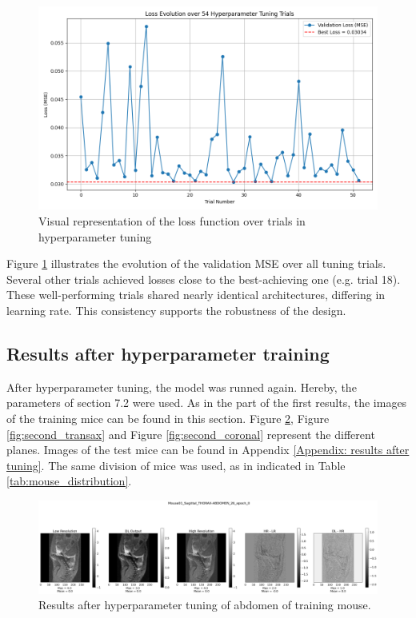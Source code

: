 \documentclass[twocolumn]{article}
\begin{document}
\begin{figure}[h]
    \centering
    \includegraphics[width=1\linewidth]{loss_hyperparameters.png}
    \caption{Visual representation of the loss function over trials in hyperparameter tuning}
    \label{fig:loss_hyperparameter}
\end{figure}

Figure \ref{fig:loss_hyperparameter} illustrates the evolution of the validation MSE over all tuning trials.
Several other trials achieved losses close to the best-achieving one (e.g. trial 18).
These well-performing trials shared nearly identical architectures, differing in learning rate. 
This consistency supports the robustness of the design. 



\subsection{Results after hyperparameter training}
After hyperparameter tuning, the model was runned again. Hereby, the parameters of section 7.2 were used.
As in the part of the first results, the images of the training mice can be found in this section.
Figure \ref{fig:second_sagittal}, Figure \ref{fig:second_transax} and Figure \ref{fig:second_coronal} represent the different planes.
Images of the test mice can be found in Appendix \ref{Appendix: results after tuning}.
The same division of mice was used, as in indicated in Table \ref{tab:mouse_distribution}.

\begin{figure}
    \centering
    \includegraphics[width=1\linewidth]{Mouse01_Sagittal_THORAX-ABDOMEN_26_epoch_0.png}
    \caption{Results after hyperparameter tuning of abdomen of training mouse.}
    \label{fig:second_sagittal}
\end{figure}
\end{document}
